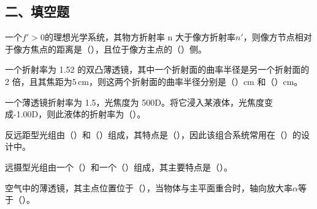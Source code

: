 \documentclass[padl, analysis, notocnum]{ExBook}
\newcommand{\answerarea}[1][3.5cm]{%
  \par\vspace{1mm}%
  \noindent{\color{themeColor!35}\rule{\linewidth}{0.4pt}}\par
  \noindent\begin{minipage}[t][#1][t]{\linewidth}\vspace{0pt}\end{minipage}\par
  \noindent{\color{themeColor!35}\rule{\linewidth}{0.4pt}}\par
}
\begin{document}
\subsection{二、填空题}
\begin{qitems}[startnum=1]
\qitem 一个$f'>0$的理想光学系统，其物方折射率 n 大于像方折射率$n'$，则像方节点相对于像方焦点的距离是（\hspace{1.6em}），且位于像方主点的（\hspace{1.6em}）侧。
\label{q:31:start}
\answerarea[4.0cm]
\label{q:31:end}
\end{qitems}

\begin{qitems}[startnum=2]
\qitem 一个折射率为 1.52 的双凸薄透镜，其中一个折射面的曲率半径是另一个折射面的 2 倍，且其焦距为$5\,\mathrm{cm}$，则这两个折射面的曲率半径分别是（\hspace{1.6em}）cm 和（\hspace{1.6em}）cm。
\label{q:32:start}
\answerarea[4.0cm]
\label{q:32:end}
\end{qitems}

\begin{qitems}[startnum=3]
\qitem 一个薄透镜折射率为 1.5，光焦度为 500D。将它浸入某液体，光焦度变成-1.00D，则此液体的折射率为（\hspace{1.6em}）。
\label{q:33:start}
\answerarea[4.0cm]
\label{q:33:end}
\end{qitems}

\begin{qitems}[startnum=4]
\qitem 反远距型光组由（\hspace{1.6em}）和（\hspace{1.6em}）组成，其特点是（\hspace{1.6em}），因此该组合系统常用在（\hspace{1.6em}）的设计中。
\label{q:34:start}
\answerarea[4.0cm]
\label{q:34:end}
\end{qitems}

\begin{qitems}[startnum=5]
\qitem 远摄型光组由一个（\hspace{1.6em}）和一个（\hspace{1.6em}）组成，其主要特点是（\hspace{1.6em}）。
\label{q:35:start}
\answerarea[4.0cm]
\label{q:35:end}
\end{qitems}

\begin{qitems}[startnum=6]
\qitem 空气中的薄透镜，其主点位置位于（\hspace{1.6em}），当物体与主平面重合时，轴向放大率$\alpha$等于（\hspace{1.6em}）。
\label{q:36:start}
\answerarea[4.0cm]
\label{q:36:end}
\end{qitems}
\end{document}
